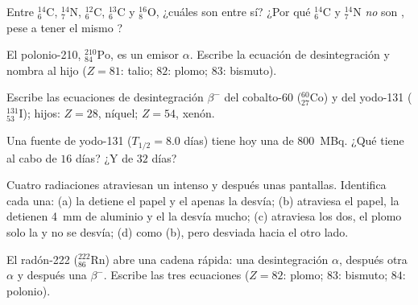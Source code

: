 \begin{exercise}[$\star$]\label{exo:g11:nucleus-radioactivity:2}
Entre ${}^{14}_{6}\mathrm{C}$, ${}^{14}_{7}\mathrm{N}$,
${}^{12}_{6}\mathrm{C}$, ${}^{13}_{6}\mathrm{C}$ y
${}^{16}_{8}\mathrm{O}$, ¿cuáles son  entre sí? ¿Por qué
${}^{14}_{6}\mathrm{C}$ y ${}^{14}_{7}\mathrm{N}$ \emph{no} son
, pese a tener el mismo ?
\end{exercise}

\begin{exercise}[$\star$]\label{exo:g11:nucleus-radioactivity:3}
El polonio-210, ${}^{210}_{84}\mathrm{Po}$, es un emisor $\alpha$.
Escribe la ecuación de desintegración y nombra al hijo ($Z = 81$: talio;
$82$: plomo; $83$: bismuto).
\end{exercise}

\begin{exercise}[$\star$]\label{exo:g11:nucleus-radioactivity:4}
Escribe las ecuaciones de desintegración $\beta^-$ del cobalto-60
(${}^{60}_{27}\mathrm{Co}$) y del yodo-131
(${}^{131}_{53}\mathrm{I}$); hijos: $Z = 28$, níquel; $Z = 54$, xenón.
\end{exercise}

\begin{exercise}[$\star$]\label{exo:g11:nucleus-radioactivity:5}
Una fuente de yodo-131 ($T_{1/2} = 8.0$ días) tiene hoy una  de
\qty{800}{MBq}. ¿Qué  tiene al cabo de $16$ días? ¿Y de $32$
días?
\end{exercise}

\begin{exercise}[$\star\star$]\label{exo:g11:nucleus-radioactivity:6}
Cuatro radiaciones atraviesan un  intenso y después unas
pantallas. Identifica cada una: (a) la detiene el papel y el 
apenas la desvía; (b) atraviesa el papel, la detienen \qty{4}{mm} de
aluminio y el  la desvía mucho; (c) atraviesa los dos, el plomo
solo la  y no se desvía; (d) como (b), pero desviada hacia el otro
lado.
\end{exercise}

\begin{exercise}[$\star\star$]\label{exo:g11:nucleus-radioactivity:7}
El radón-222 (${}^{222}_{86}\mathrm{Rn}$) abre una cadena rápida: una
desintegración $\alpha$, después otra $\alpha$ y después una $\beta^-$.
Escribe las tres ecuaciones ($Z = 82$: plomo; $83$: bismuto; $84$:
polonio).
\end{exercise}


